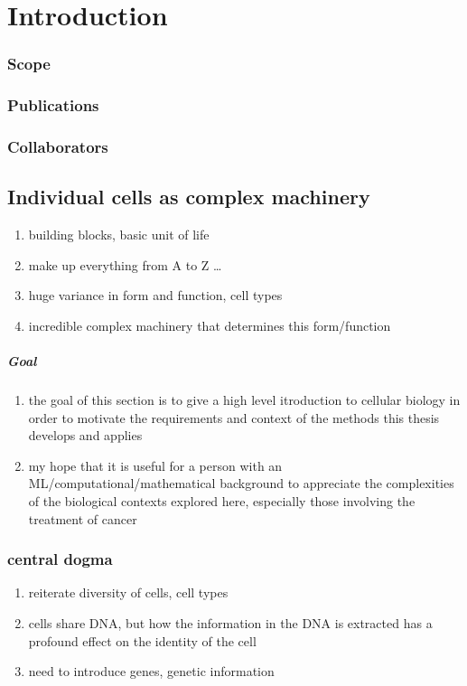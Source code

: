 \chapter{Introduction}
\subsection{Scope}
\subsection{Publications}
\subsection{Collaborators}

\section{Individual cells as complex machinery}
\begin{enumerate}
  \item building blocks, basic unit of life
  \item make up everything from A to Z \ldots
  \item huge variance in form and function, cell types
  \item incredible complex machinery that determines this form/function
\end{enumerate}

\paragraph{Goal}
\begin{enumerate}
  \item the goal of this section is to give a high level itroduction to cellular biology in order to motivate the requirements and context of the methods this thesis develops and applies
  \item my hope that it is useful for a person with an ML/computational/mathematical background to appreciate the complexities of the biological contexts explored here, especially those involving the treatment of cancer
\end{enumerate}

\subsection{central dogma}
\begin{enumerate}
  \item reiterate diversity of cells, cell types
  \item cells share DNA, but how the information in the DNA is extracted has a profound effect on the identity of the cell
  \item need to introduce genes, genetic information
\end{enumerate}

